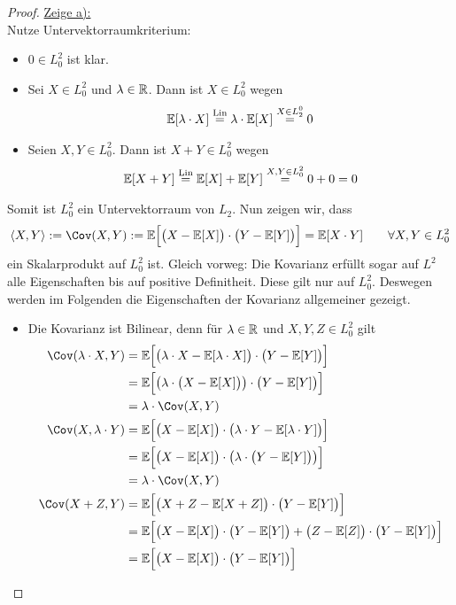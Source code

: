 \documentclass[12pt,a4paper]{article}
\begin{document}
\begin{proof}
\underline{Zeige a):}\\
Nutze Untervektorraumkriterium:
\begin{itemize}
\item $0\in L_0^2$ ist klar.
\item Sei $X\in L_0^2$ und $\lambda\in\mathbb{R}$. Dann ist $X\in L_0^2$ wegen
\begin{align*}
\mathbb{E}[\lambda\cdot X]\stackrel{\text{Lin}}{=}\lambda\cdot\mathbb{E}[X]\stackrel{X\in L_2^0}{=}0
\end{align*}
\item Seien $X,Y\in L_0^2$. Dann ist $X+Y\in L_0^2$ wegen
\begin{align*}
\mathbb{E}[X+Y]\stackrel{\text{Lin}}{=}\mathbb{E}[X]+\mathbb{E}[Y]\stackrel{X,Y\in L_0^2}{=}0+0=0
\end{align*}
\end{itemize}
Somit ist $L_0^2$ ein Untervektorraum von $L_2$. Nun zeigen wir, dass
\begin{align*}
\langle X,Y\rangle:=\Cov(X,Y):=
\E\Big[\big(X-\E[X]\big)\cdot\big(Y-\E[Y]\big)\Big]
=\E[X\cdot Y]
\qquad\forall X,Y\in L_0^2
\end{align*}
ein Skalarprodukt auf $L_0^2$ ist. Gleich vorweg: Die Kovarianz erfüllt sogar auf $L^2$ alle Eigenschaften bis auf positive Definitheit. Diese gilt nur auf $L_0^2$. Deswegen werden im Folgenden die Eigenschaften der Kovarianz allgemeiner gezeigt.
\begin{itemize}
\item Die Kovarianz ist Bilinear, denn für $\lambda\in\mathbb{R}$ und $X,Y,Z\in L_0^2$ gilt
\begin{align*}
\Cov(\lambda\cdot X,Y)
&=\E\Big[\big(\lambda\cdot X-\E[ \lambda\cdot X]\big)\cdot\big(Y-\E[Y]\big)\Big]\\
&=\E\Big[\big(\lambda\cdot\big(X-\E[X]\big)\big)\cdot\big(Y-\E[Y]\big)\Big]\\
&=\lambda\cdot\Cov(X,Y)\\
\Cov(X,\lambda\cdot Y)
&=\E\Big[\big(X-\E[X]\big)\cdot\big(\lambda\cdot Y-\E[\lambda\cdot Y]\big)\Big]\\
&=\E\Big[\big(X-\E[X]\big)\cdot\big(\lambda\cdot\big(Y-\E[Y]\big)\big)\Big]\\
&=\lambda\cdot\Cov(X,Y)\\
\Cov(X+Z,Y)
&=\E\Big[\big(X+Z-\E[X+Z]\big)\cdot\big(Y-\E[Y]\big)\Big]\\
&=\E\Big[\big(X-\E[X]\big)\cdot\big(Y-\E[Y]\big)+\big(Z-\E[Z]\big)\cdot\big(Y-\E[Y]\big)\Big]\\
&=\E\Big[\big(X-\E[X]\big)\cdot\big(Y-\E[Y]\big)\Big]

\end{align*}
\end{itemize}
\end{proof}
\end{document}
